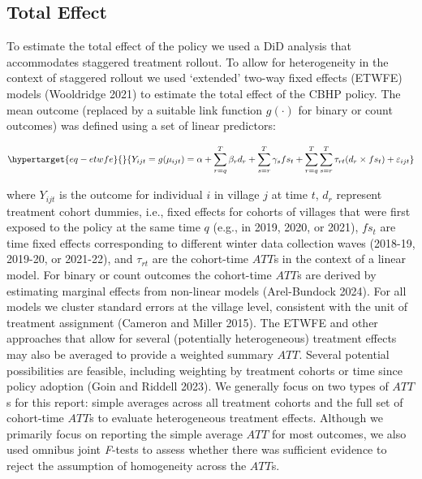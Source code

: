 \documentclass[
  letterpaper,
  DIV=11,
  numbers=noendperiod]{scrartcl}
\begin{document}
\hypertarget{total-effect}{%
\subsection{Total Effect}\label{total-effect}}

To estimate the total effect of the policy we used a DiD analysis that
accommodates staggered treatment rollout. To allow for heterogeneity in
the context of staggered rollout we used `extended' two-way fixed
effects (ETWFE) models (Wooldridge 2021) to estimate the total effect of
the CBHP policy. The mean outcome (replaced by a suitable link function
\(g(\cdot)\) for binary or count outcomes) was defined using a set of
linear predictors:

\begin{equation}\protect\hypertarget{eq-etwfe}{}{Y_{ijt}=g(\mu_{ijt}) = \alpha + \sum_{r=q}^{T} \beta_{r} d_{r} + \sum_{s=r}^{T} \gamma_{s} fs_{t}+ \sum_{r=q}^{T} \sum_{s=r}^{T} \tau_{rt} (d_{r} \times fs_{t}) + \varepsilon_{ijt}}\label{eq-etwfe}\end{equation}

where \(Y_{ijt}\) is the outcome for individual \(i\) in village \(j\)
at time \(t\), \(d_{r}\) represent treatment cohort dummies, i.e., fixed
effects for cohorts of villages that were first exposed to the policy at
the same time \(q\) (e.g., in 2019, 2020, or 2021), \(fs_{t}\) are time
fixed effects corresponding to different winter data collection waves
(2018-19, 2019-20, or 2021-22), and \(\tau_{rt}\) are the cohort-time
\(ATT\)s in the context of a linear model. For binary or count outcomes
the cohort-time \(ATT\)s are derived by estimating marginal effects from
non-linear models (Arel-Bundock 2024). For all models we cluster
standard errors at the village level, consistent with the unit of
treatment assignment (Cameron and Miller 2015). The ETWFE and other
approaches that allow for several (potentially heterogeneous) treatment
effects may also be averaged to provide a weighted summary \(ATT\).
Several potential possibilities are feasible, including weighting by
treatment cohorts or time since policy adoption (Goin and Riddell 2023).
We generally focus on two types of \(ATT\)s for this report: simple
averages across all treatment cohorts and the full set of cohort-time
\(ATT\)s to evaluate heterogeneous treatment effects. Although we
primarily focus on reporting the simple average \(ATT\) for most
outcomes, we also used omnibus joint \emph{F}-tests to assess whether
there was sufficient evidence to reject the assumption of homogeneity
across the \(ATT\)s.
\end{document}

